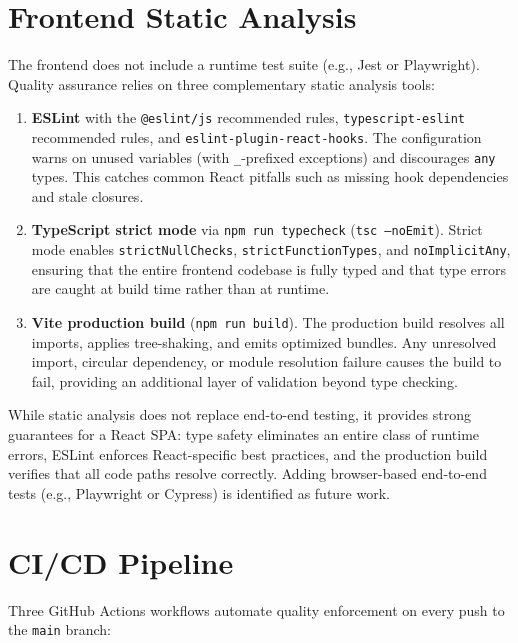 \documentclass[12pt,letterpaper]{report}
\begin{document}
\section{Frontend Static Analysis}

The frontend does not include a runtime test suite (e.g., Jest or Playwright). Quality assurance relies on three complementary static analysis tools:

\begin{enumerate}
    \item \textbf{ESLint} with the \texttt{@eslint/js} recommended rules, \texttt{typescript-eslint} recommended rules, and \texttt{eslint-plugin-react-hooks}. The configuration warns on unused variables (with \texttt{\_}-prefixed exceptions) and discourages \texttt{any} types. This catches common React pitfalls such as missing hook dependencies and stale closures.

    \item \textbf{TypeScript strict mode} via \texttt{npm run typecheck} (\texttt{tsc --noEmit}). Strict mode enables \texttt{strictNullChecks}, \texttt{strictFunctionTypes}, and \texttt{noImplicitAny}, ensuring that the entire frontend codebase is fully typed and that type errors are caught at build time rather than at runtime.

    \item \textbf{Vite production build} (\texttt{npm run build}). The production build resolves all imports, applies tree-shaking, and emits optimized bundles. Any unresolved import, circular dependency, or module resolution failure causes the build to fail, providing an additional layer of validation beyond type checking.
\end{enumerate}

While static analysis does not replace end-to-end testing, it provides strong guarantees for a React SPA: type safety eliminates an entire class of runtime errors, ESLint enforces React-specific best practices, and the production build verifies that all code paths resolve correctly. Adding browser-based end-to-end tests (e.g., Playwright or Cypress) is identified as future work.

\section{CI/CD Pipeline}

Three GitHub Actions workflows automate quality enforcement on every push to the \texttt{main} branch:
\end{document}
